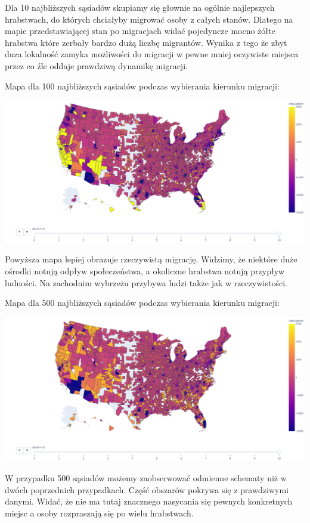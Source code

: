 \documentclass[a4paper,12pt]{article}
\begin{document}
Dla 10 najbliższych sąsiadów skupiamy się głownie na ogólnie najlepszych hrabstwach, do których chciałyby migrować osoby z całych stanów. Dlatego na mapie przedstawiającej stan po migracjach widać pojedyncze mocno żółte hrabstwa które zerbały bardzo dużą liczbę migrantów. Wynika z tego że zbyt duza lokalność zamyka możliwości do migracji w pewne mniej oczywiste miejsca przez co źle oddaje prawdziwą dynamikę migracji.


Mapa dla 100 najbliższych sąsiadów podczas wybierania kierunku migracji:
\begin{center}
    \includegraphics*[width=15cm]{./pictures/population_k100.png}
\end{center}

Powyższa mapa lepiej obrazuje rzeczywistą migrację. Widzimy, że niektóre duże ośrodki notują odpływ społeczeństwa, a okoliczne hrabstwa notują przypływ ludności. Na zachodnim wybrzeżu przybywa ludzi także jak w rzeczywistości. 


Mapa dla 500 najbliższych sąsiadów podczas wybierania kierunku migracji:
\begin{center}
    \includegraphics*[width=15cm]{./pictures/population_k500.png}
\end{center}

W przypadku 500 sąsiadów możemy zaobserwować odmienne schematy niż w dwóch poprzednich przypadkach. Część obszarów pokrywa się z prawdziwymi danymi. Widać, że nie ma tutaj znacznego nasycania się pewnych konkretnych miejsc a osoby rozpraszają się po wielu hrabstwach.
\end{document}
